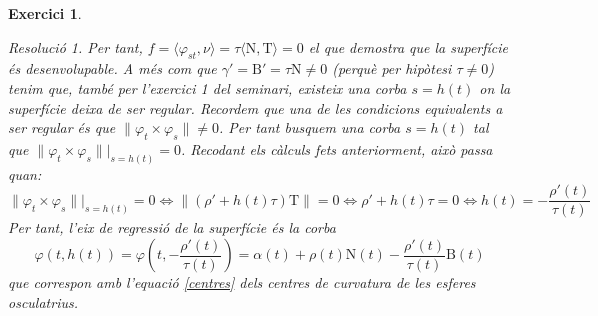 \documentclass[10pt,a4paper]{article}
\newcommand{\vf}[1]{\boldsymbol{\mathrm{#1}}} %
\newtheorem{exercice}{Exercici}
\theoremstyle{remark}
\newtheorem*{resolution}{Resolució}
\theoremstyle{math}
\begin{document}
\begin{exercice}
\begin{enumerate}
\begin{resolution}
            Per tant, $f=\langle\varphi_{st},\nu\rangle=\tau\langle\vf{N},\vf{T}\rangle=0$ el que demostra que la superfície és desenvolupable. A més com que $\gamma'=\vf{B}'=\tau\vf{N}\ne 0$ (perquè per hipòtesi $\tau\ne 0$) tenim que, també per l'exercici 1 del seminari, existeix una corba $s=h(t)$ on la superfície deixa de ser regular. Recordem que una de les condicions equivalents a ser regular és que $\|\varphi_t\times\varphi_s\|\ne 0$. Per tant busquem una corba $s=h(t)$ tal que $\|\varphi_t\times\varphi_s\|\big|_{s=h(t)}=0$. Recodant els càlculs fets anteriorment, això passa quan:
            $$\|\varphi_t\times\varphi_s\|\big|_{s=h(t)}=0\iff \|(\rho'+h(t)\tau)\vf{T} \|=0\iff \rho'+h(t)\tau= 0\iff h(t)=-\frac{\rho'(t)}{\tau(t)}$$
            Per tant, l'eix de regressió de la superfície és la corba $$\varphi(t,h(t))=\varphi\left(t,-\frac{\rho'(t)}{\tau(t)}\right)= \alpha(t) + \rho(t)\vf{N}(t) - \frac{\rho'(t)}{\tau(t)}\vf{B}(t)$$
            que correspon amb l'equació \eqref{centres} dels centres de curvatura de les esferes osculatrius.
          \end{resolution}
  \end{enumerate}
\end{exercice}
\end{document}
